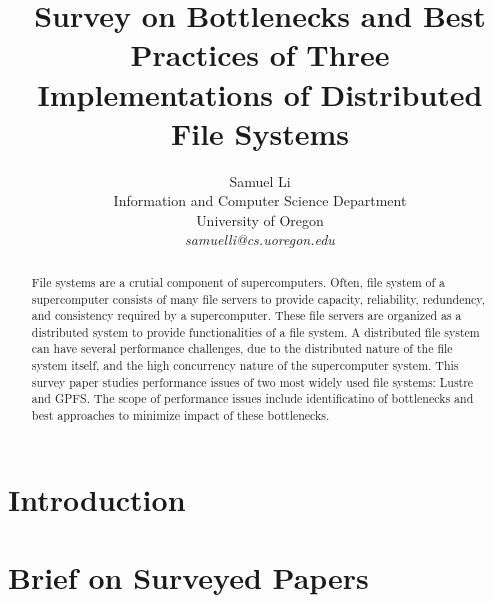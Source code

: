\documentclass[12pt,twocolumn]{IEEEtran11}
\begin{document}


\title{\Large \bf 
Survey on Bottlenecks and Best Practices of Three Implementations of
Distributed File Systems
}
\author{
Samuel Li\\
Information and Computer Science Department\\
University of Oregon\\
{\em samuelli@cs.uoregon.edu}
}
\maketitle
\begin{abstract}
File systems are a crutial component of supercomputers.
%
Often, file system of a supercomputer consists of many file servers
to provide capacity, reliability, redundency, and consistency
required by a supercomputer.
%
These file servers are organized as a distributed system
to provide functionalities of a file system.
%
A distributed file system can have several performance challenges,
due to the distributed nature of the file system itself,
and the high concurrency nature of the supercomputer system.
%
This survey paper studies performance issues of two most widely 
used file systems: Lustre and GPFS.
%
The scope of performance issues include identificatino of bottlenecks
and best approaches to minimize impact of these bottlenecks.
\end{abstract}


\section{Introduction}
\label{sec:intro}


\section{Brief on Surveyed Papers}
\label{sec:brief}



\end{document}
